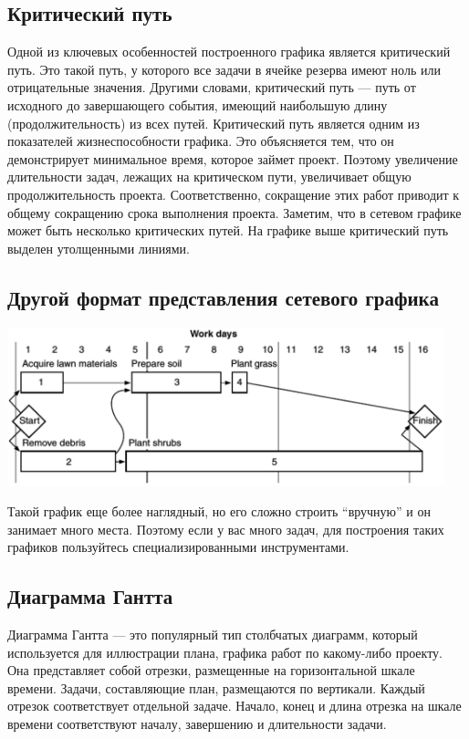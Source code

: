 \documentclass{../../text-style}
\begin{document}
\subsection{Критический путь}

Одной из ключевых особенностей построенного графика является критический путь. Это такой путь, у которого все задачи в ячейке резерва  имеют ноль или отрицательные значения. Другими словами, критический путь --- путь от исходного до завершающего события, имеющий наибольшую длину (продолжительность) из всех путей. Критический путь является одним из показателей жизнеспособности графика. Это объясняется тем, что он демонстрирует минимальное время, которое займет проект. Поэтому увеличение длительности задач, лежащих на критическом пути, увеличивает общую продолжительность проекта. Соответственно, сокращение этих работ приводит к общему сокращению срока выполнения проекта. Заметим, что в сетевом графике может быть несколько критических путей. На графике выше критический путь выделен утолщенными линиями.

\subsection{Другой формат представления сетевого графика}

\begin{center}
    \includegraphics[width=0.95\textwidth]{otherGraphFormat.png}
\end{center}

Такой график еще более наглядный, но его сложно строить \enquote{вручную} и он занимает много места. Поэтому если у вас много задач, для построения таких графиков пользуйтесь специализированными инструментами.

\subsection{Диаграмма Гантта}

Диаграмма Гантта --- это популярный тип столбчатых диаграмм, который используется для иллюстрации плана, графика работ по какому-либо проекту. Она представляет собой отрезки, размещенные на горизонтальной шкале времени. Задачи, составляющие план, размещаются по вертикали. Каждый отрезок соответствует отдельной задаче. Начало, конец и длина отрезка на шкале времени соответствуют началу, завершению и длительности задачи.
\end{document}
